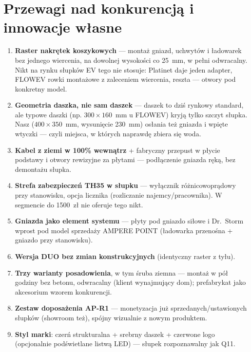 \documentclass[11pt,a4paper]{article}
\begin{document}
\section{Przewagi nad konkurencją i innowacje własne}
\begin{enumerate}
\item \textbf{Raster nakrętek koszykowych} --- montaż gniazd, uchwytów i ładowarek bez jednego
wiercenia, na dowolnej wysokości co 25~mm, w pełni odwracalny. Nikt na rynku słupków EV tego nie
stosuje: Platinet daje jeden adapter, FLOWEV rowki montażowe z zaleceniem wiercenia, reszta ---
otwory pod konkretny model.
\item \textbf{Geometria daszka, nie sam daszek} --- daszek to dziś rynkowy standard, ale typowe
daszki (np. $300\times160$~mm u FLOWEV) kryją tylko szczyt słupka. Nasz ($400\times350$~mm,
wysunięcie 230~mm) osłania też gniazda i wpięte wtyczki --- czyli miejsca, w których naprawdę
zbiera się woda.
\item \textbf{Kabel z ziemi w 100\% wewnątrz} + fabryczny przepust w płycie podstawy i otwory
rewizyjne za płytami --- podłączenie gniazda ręką, bez demontażu słupka.
\item \textbf{Strefa zabezpieczeń TH35 w słupku} --- wyłącznik różnicowoprądowy przy stanowisku,
opcja licznika (rozliczanie najemcy/pracownika). W segmencie do 1500~zł nie oferuje tego nikt.
\item \textbf{Gniazda jako element systemu} --- płyty pod gniazdo siłowe i Dr.~Storm wprost pod
model sprzedaży AMPERE POINT (ładowarka przenośna + gniazdo przy stanowisku).
\item \textbf{Wersja DUO bez zmian konstrukcyjnych} (identyczny raster z tyłu).
\item \textbf{Trzy warianty posadowienia}, w tym śruba ziemna --- montaż w pół godziny bez betonu,
odwracalny (klient wynajmujący dom); prefabrykat jako akcesorium wzorem konkurencji.
\item \textbf{Zestaw doposażenia AP-R1} --- monetyzacja już sprzedanych/ustawionych słupków
(showroom też), spójny wizualnie z nowym produktem.
\item \textbf{Styl marki}: czerń strukturalna + srebrny daszek + czerwone logo (opcjonalnie
podświetlane listwą LED) --- słupek rozpoznawalny jak Q11.
\end{enumerate}
\end{document}
